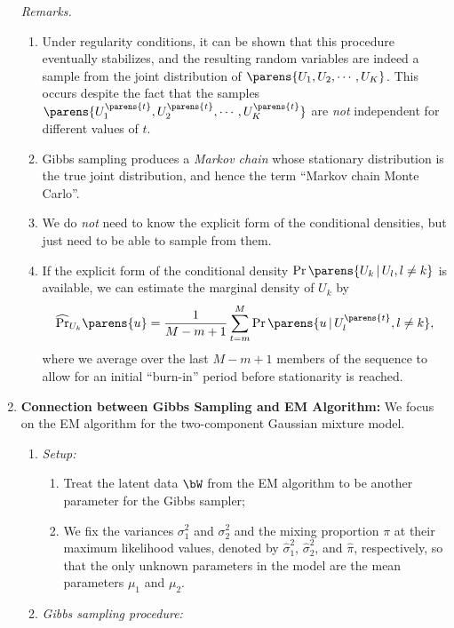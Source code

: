 \documentclass[12pt]{article}
\begin{document}
\begin{enumerate}[label=\textbf{\arabic*.}]
	\textit{Remarks.}
	\begin{enumerate}
		\item Under regularity conditions, it can be shown that this procedure eventually stabilizes, and the resulting random variables are indeed a sample from the joint distribution of $\parens{U_1, U_2, \cdots, U_K}$. This occurs despite the fact that the samples $\parens{U_1^{\parens{t}}, U_2^{\parens{t}}, \cdots, U_K^{\parens{t}}}$ are \emph{not} independent for different values of $t$. 
		\item Gibbs sampling produces a \emph{Markov chain} whose stationary distribution is the true joint distribution, and hence the term ``Markov chain Monte Carlo''. 
		\item We do \emph{not} need to know the explicit form of the conditional densities, but just need to be able to sample from them. 
		\item If the explicit form of the conditional density $\Pr \parens{U_k \,\vert\, U_{l}, l \neq k}$ is available, we can estimate the marginal density of $U_k$ by 
		\begin{align}\label{eq-estimate-marginal-den}
			\widehat{\Pr}_{U_k} \parens{u} = \frac{1}{M-m+1} \sum_{t=m}^M \Pr \parens{u \,\vert\, U_{l}^{\parens{t}}, l \neq k}, 
		\end{align}
		where we average over the last $M - m + 1$ members of the sequence to allow for an initial ``burn-in'' period before stationarity is reached. 
	\end{enumerate}
	
	\item \textbf{Connection between Gibbs Sampling and EM Algorithm:} We focus on the EM algorithm for the two-component Gaussian mixture model. 
	\begin{enumerate}
		\item \textit{Setup:}
		\begin{enumerate}
			\item Treat the latent data $\bW$ from the EM algorithm to be another parameter for the Gibbs sampler; 
			\item We fix the variances $\sigma_1^2$ and $\sigma_2^2$ and the mixing proportion $\pi$ at their maximum likelihood values, denoted by $\hat{\sigma}_1^2$, $\hat{\sigma}_2^2$, and $\hat{\pi}$, respectively, so that the only unknown parameters in the model are the mean parameters $\mu_1$ and $\mu_2$. 
		\end{enumerate}
		
		\item \textit{Gibbs sampling procedure:}
		

\end{enumerate}
\end{enumerate}
\end{document}
